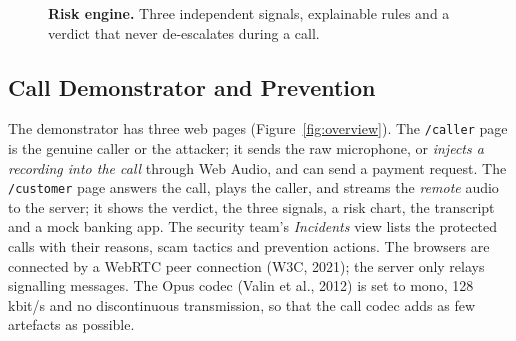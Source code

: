 \documentclass[10pt,a4paper,twocolumn]{article}
\newcommand{\llr}{\ell}
\begin{document}
\begin{figure}[t]
\centering
{}
\caption{\textbf{Risk engine.} Three independent signals, explainable rules and a verdict that never de-escalates during a call.}
\label{fig:risk}
\end{figure}

\subsection{Call Demonstrator and Prevention}
\label{sec:call}
The demonstrator has three web pages (Figure~\ref{fig:overview}). The \texttt{/caller} page is the genuine caller or the attacker; it sends the raw microphone, or \emph{injects a recording into the call} through Web Audio, and can send a payment request. The \texttt{/customer} page answers the call, plays the caller, and streams the \emph{remote} audio to the server; it shows the verdict, the three signals, a risk chart, the transcript and a mock banking app. The security team's \emph{Incidents} view lists the protected calls with their reasons, scam tactics and prevention actions. The browsers are connected by a WebRTC peer connection (W3C, 2021); the server only relays signalling messages. The Opus codec (Valin et al., 2012) is set to mono, 128\,kbit/s and no discontinuous transmission, so that the call codec adds as few artefacts as possible.
\end{document}
